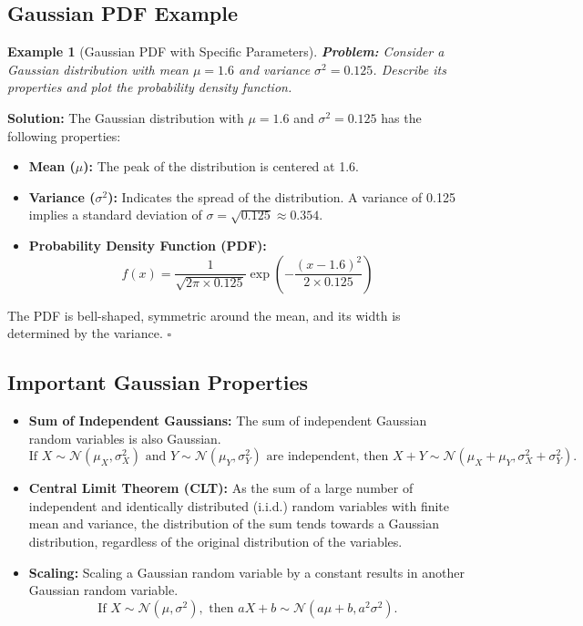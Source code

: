 \documentclass[12pt]{article}
\newtheorem{example}{Example}
\newenvironment{solution}{\noindent\textbf{Solution:}}{\hfill$\square$}
\begin{document}
\subsection{Gaussian PDF Example}
\begin{example}[Gaussian PDF with Specific Parameters]
    \textbf{Problem:} Consider a Gaussian distribution with mean \( \mu = 1.6 \) and variance \( \sigma^2 = 0.125 \). Describe its properties and plot the probability density function.
\end{example}
\begin{solution}
    The Gaussian distribution with \( \mu = 1.6 \) and \( \sigma^2 = 0.125 \) has the following properties:
    \begin{itemize}
        \item \textbf{Mean (\( \mu \)):} The peak of the distribution is centered at 1.6.
        \item \textbf{Variance (\( \sigma^2 \)):} Indicates the spread of the distribution. A variance of 0.125 implies a standard deviation of \( \sigma = \sqrt{0.125} \approx 0.354 \).
        \item \textbf{Probability Density Function (PDF):}
        \[
        f(x) = \frac{1}{\sqrt{2\pi \times 0.125}} \exp\left( -\frac{(x - 1.6)^2}{2 \times 0.125} \right)
        \]
    \end{itemize}
    The PDF is bell-shaped, symmetric around the mean, and its width is determined by the variance.
\end{solution}

\subsection{Important Gaussian Properties}
\begin{itemize}
    \item \textbf{Sum of Independent Gaussians:} The sum of independent Gaussian random variables is also Gaussian.
    \[
    \text{If } X \sim \mathcal{N}(\mu_X, \sigma_X^2) \text{ and } Y \sim \mathcal{N}(\mu_Y, \sigma_Y^2) \text{ are independent, then } X + Y \sim \mathcal{N}(\mu_X + \mu_Y, \sigma_X^2 + \sigma_Y^2).
    \]
    \item \textbf{Central Limit Theorem (CLT):} As the sum of a large number of independent and identically distributed (i.i.d.) random variables with finite mean and variance, the distribution of the sum tends towards a Gaussian distribution, regardless of the original distribution of the variables.
    \item \textbf{Scaling:} Scaling a Gaussian random variable by a constant results in another Gaussian random variable.
    \[
    \text{If } X \sim \mathcal{N}(\mu, \sigma^2), \text{ then } aX + b \sim \mathcal{N}(a\mu + b, a^2\sigma^2).
    \]
\end{itemize}
\end{document}
